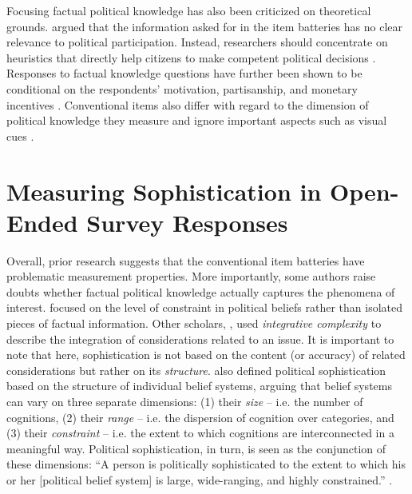\documentclass[12pt]{article}
\begin{document}
Focusing factual political knowledge has also been criticized on theoretical grounds. \citet{lupia2006elitism} argued that the information asked for in the item batteries has no clear relevance to political participation. Instead, researchers should concentrate on heuristics that directly help citizens to make competent political decisions \citep[see also][]{lupia1994shortcuts}. Responses to factual knowledge questions have further been shown to be conditional on the respondents' motivation, partisanship, and monetary incentives \citep{prior2008money,bullock2015partisan,prior2015you}. Conventional items also differ with regard to the dimension of political knowledge they measure \citep{barabas2014question} and ignore important aspects such as visual cues \citep{prior2014visual}.


\section*{Measuring Sophistication in Open-Ended Survey Responses}

Overall, prior research suggests that the conventional item batteries have problematic measurement properties. More importantly, some authors raise doubts whether factual political knowledge actually captures the phenomena of interest. \citet{converse1964nature} focused on the level of constraint in political beliefs rather than isolated pieces of factual information. Other scholars, \citet{tetlock1983cognitive}, used \textsl{integrative complexity} to describe the integration of considerations related to an issue. It is important to note that here, sophistication is not based on the content (or accuracy) of related considerations but rather on its \textsl{structure}. \citet{luskin1987measuring} also defined political sophistication based on the structure of individual belief systems, arguing that belief systems can vary on three separate dimensions: (1) their \textsl{size} -- i.e. the number of cognitions, (2) their \textsl{range} -- i.e. the dispersion of cognition over categories, and (3) their \textsl{constraint} -- i.e. the extent to which cognitions are interconnected in a meaningful way. Political sophistication, in turn, is seen as the conjunction of these dimensions: ``A person is politically sophisticated to the extent to which his or her [political belief system] is large, wide-ranging, and highly constrained.'' \citep[860]{luskin1987measuring}.
\end{document}
